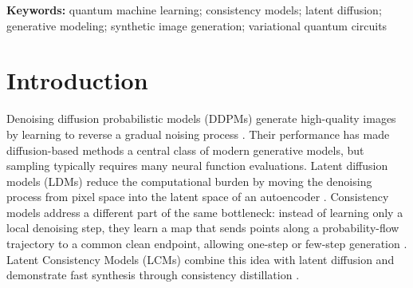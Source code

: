 \documentclass[11pt]{article}
\begin{document}
\begin{abstract}
multistep sampler alone; fixing the sampler was necessary but not
sufficient, and few-step sampling only stabilized once the training script
was corrected to perform teacher distillation rather than training from data
alone. We report the quantum-placement result as a negative finding for the
architectures and dataset scale tested, together with the full evidence
package needed to reproduce or challenge it. Motivated by the possibility that
quantum consistency distillation could still be valuable purely as a way to
avoid the many-step sampling regime of existing quantum diffusion models, we
additionally trained the same quantum circuit as a naive multi-step
noise-predicting diffusion baseline rather than a consistency student. This
baseline's training loss plateaus at 0.954$\pm$0.001 noise MSE across 3
seeds --- barely below the 1.0 achieved by always predicting zero noise, and
well above the classical teacher's $\approx$0.85 --- and its sample quality is
statistically flat from 1 to 50 sampling steps (FID-like $337.9\pm1.5$ vs.\
$345.0\pm4.7$). We interpret this as evidence that the quantum circuit's
capacity, not the number of sampling steps, is the binding constraint at this
qubit and depth budget: a module too weak to learn a useful score function
cannot benefit from more NFEs, so the intended ``few-step quantum consistency
beats many-step quantum diffusion'' comparison is not yet meaningful until a
quantum diffusion baseline of this kind can be trained to a competitive loss
in the first place.
\end{abstract}

\textbf{Keywords:} quantum machine learning; consistency models; latent
diffusion; generative modeling; synthetic image generation; variational quantum
circuits

\section{Introduction}

Denoising diffusion probabilistic models (DDPMs) generate high-quality images by
learning to reverse a gradual noising process \citep{ho2020ddpm}. Their
performance has made diffusion-based methods a central class of modern
generative models, but sampling typically requires many neural function
evaluations. Latent diffusion models (LDMs) reduce the computational burden by
moving the denoising process from pixel space into the latent space of an
autoencoder \citep{rombach2022ldm}. Consistency models address a different part
of the same bottleneck: instead of learning only a local denoising step, they
learn a map that sends points along a probability-flow trajectory to a common
clean endpoint, allowing one-step or few-step generation
\citep{song2023consistency}. Latent Consistency Models (LCMs) combine this idea
with latent diffusion and demonstrate fast synthesis through consistency
distillation \citep{luo2023lcm}.
\end{document}

